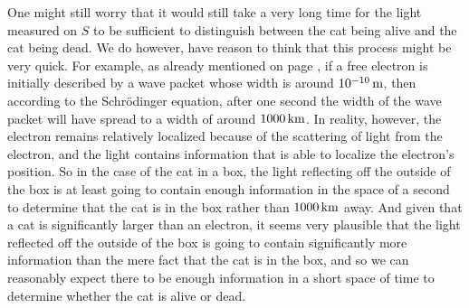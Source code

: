 One might still worry that it would still take a very long time for the light measured on $S$ to be sufficient to distinguish between the cat being alive and the cat being dead. We do however, have reason to think that this process might be very quick. For example, as already mentioned on page \pageref{electronspread},  if a free electron is initially described by a wave packet whose width is around $\du{e-10}{\m}$, then according to the Schr\"{o}dinger equation, after one second the width of the wave packet will have spread to a width of around $\du{1000}{\km}$. In reality, however, the electron remains relatively localized because of the scattering of light from the electron, and the light contains information that is able to localize the electron's position. So in the case of the cat in a box, the light reflecting off the outside of the box is at least going to contain enough information in the space of a second to determine that the cat is in the box rather than $\du{1000}{\km}$ away. And given that a cat is significantly larger than an electron, it seems very plausible that the light reflected off the outside of the box is going to contain significantly more information than the mere fact that the cat is in the box, and so we can reasonably expect there to be enough information in a short space of time to determine whether the cat is alive or dead.
    
